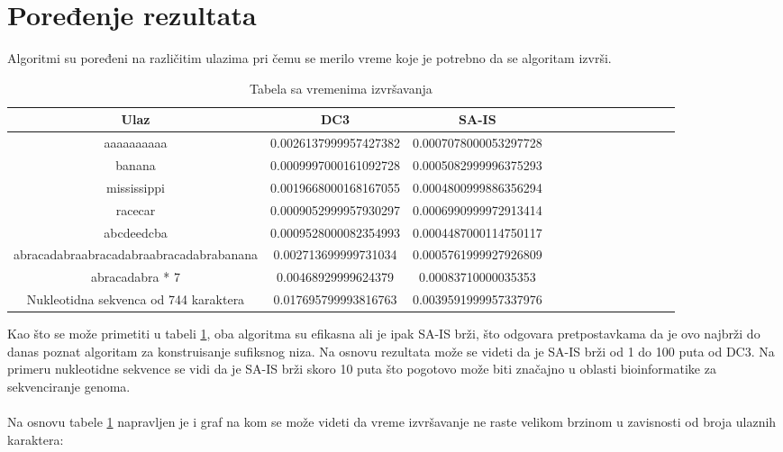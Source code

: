 \documentclass[serbian]{article}
\begin{document}
\section{Poređenje rezultata}
Algoritmi su poređeni na različitim ulazima pri čemu se merilo vreme koje je potrebno da se algoritam izvrši.

\begin{table}[h!]
    \begin{center}
        \begin{tabular}{|c|c|c|c|c|c|c|c|c|c|c|c|c|} \hline
        Ulaz & DC3 & SA-IS\\ \hline
        aaaaaaaaaa & 0.0026137999957427382 & 0.0007078000053297728\\ \hline
        banana & 0.0009997000161092728 & 0.0005082999996375293\\ \hline
        mississippi & 0.0019668000168167055 & 0.0004800999886356294\\ \hline
        racecar & 0.0009052999957930297 & 0.0006990999972913414\\ \hline
        abcdeedcba & 0.0009528000082354993 & 0.0004487000114750117\\ \hline
        abracadabraabracadabraabracadabrabanana & 0.002713699999731034 & 0.0005761999927926809\\ \hline
        abracadabra * 7 & 0.00468929999624379 & 0.00083710000035353\\ \hline
        Nukleotidna sekvenca od 744 karaktera & 0.017695799993816763 & 0.0039591999957337976\\ \hline
        \end{tabular}
        \caption{Tabela sa vremenima izvršavanja}
        \label{table:3}
    \end{center}
\end{table}

Kao što se može primetiti u tabeli \ref{table:3}, oba algoritma su efikasna ali je ipak SA-IS brži, što odgovara pretpostavkama da je ovo najbrži do danas poznat algoritam za konstruisanje sufiksnog niza. Na osnovu rezultata može se videti da je SA-IS brži od 1 do 100 puta od DC3. Na primeru nukleotidne sekvence se vidi da je SA-IS brži skoro 10 puta što pogotovo može biti značajno u oblasti bioinformatike za sekvenciranje genoma.
\\\\
Na osnovu tabele \ref{table:3} napravljen je i graf na kom se može videti da vreme izvršavanje ne raste velikom brzinom u zavisnosti od broja ulaznih karaktera:
\end{document}
